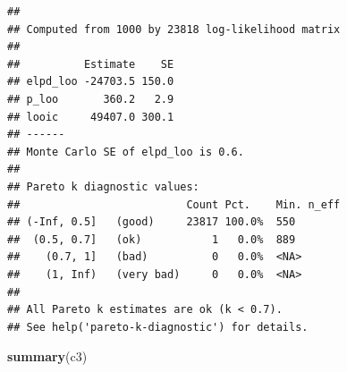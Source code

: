 \documentclass[
]{article}
\newenvironment{Shaded}{\begin{snugshade}}{\end{snugshade}}
\newcommand{\FunctionTok}[1]{\textcolor[rgb]{0.13,0.29,0.53}{\textbf{#1}}}
\newcommand{\NormalTok}[1]{#1}
\begin{document}
\begin{verbatim}
## 
## Computed from 1000 by 23818 log-likelihood matrix
## 
##          Estimate    SE
## elpd_loo -24703.5 150.0
## p_loo       360.2   2.9
## looic     49407.0 300.1
## ------
## Monte Carlo SE of elpd_loo is 0.6.
## 
## Pareto k diagnostic values:
##                          Count Pct.    Min. n_eff
## (-Inf, 0.5]   (good)     23817 100.0%  550       
##  (0.5, 0.7]   (ok)           1   0.0%  889       
##    (0.7, 1]   (bad)          0   0.0%  <NA>      
##    (1, Inf)   (very bad)     0   0.0%  <NA>      
## 
## All Pareto k estimates are ok (k < 0.7).
## See help('pareto-k-diagnostic') for details.
\end{verbatim}

\begin{Shaded}
\begin{Highlighting}[]
\FunctionTok{summary}\NormalTok{(c3)}
\end{Highlighting}
\end{Shaded}
\end{document}
